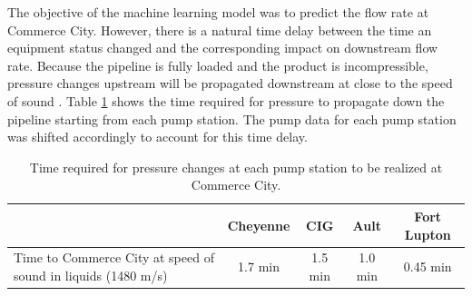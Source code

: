 The objective of the machine learning model was to predict the flow rate at Commerce City.  However, there is a natural time delay between the time an equipment status changed and the corresponding impact on downstream flow rate.  Because the pipeline is fully loaded and the product is incompressible, pressure changes upstream will be propagated downstream at close to the speed of sound \cite{fluid_mechanics}.  Table \ref{tab:08TimeToCC} shows the time required for pressure to propagate down the pipeline starting from each pump station.  The pump data for each pump station was shifted accordingly to account for this time delay.  
\begin{table}[h]
    \centering
    {
    \begin{tabular}{ p{6cm} | c | c | c | c}
             &  Cheyenne & CIG & Ault & Fort Lupton \\
        \hline
        Time to Commerce City at speed of sound in liquids (1480 m/s) \cite{fluid_mechanics}
        &  1.7 min  &  1.5 min  &  1.0 min  &  0.45 min  \\
    \end{tabular}}
    \caption{Time required for pressure changes at each pump station to be realized at Commerce City.}
    \label{tab:08TimeToCC}
\end{table}
